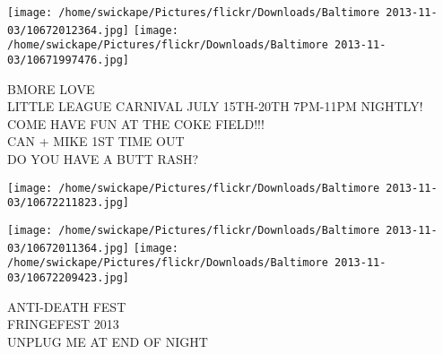 \documentclass[10pt,letterpaper]{article}
\begin{document}
\texttt{[image: /home/swickape/Pictures/flickr/Downloads/Baltimore 2013-11-03/10672012364.jpg]}
\texttt{[image: /home/swickape/Pictures/flickr/Downloads/Baltimore 2013-11-03/10671997476.jpg]}

BMORE LOVE\\
LITTLE LEAGUE CARNIVAL JULY 15TH{-}20TH 7PM{-}11PM NIGHTLY! COME HAVE FUN AT THE COKE FIELD!!!\\
CAN + MIKE 1ST TIME OUT\\
DO YOU HAVE A BUTT RASH?\\
\pagebreak

\texttt{[image: /home/swickape/Pictures/flickr/Downloads/Baltimore 2013-11-03/10672211823.jpg]}

\vspace{0.25in}
\texttt{[image: /home/swickape/Pictures/flickr/Downloads/Baltimore 2013-11-03/10672011364.jpg]}
\texttt{[image: /home/swickape/Pictures/flickr/Downloads/Baltimore 2013-11-03/10672209423.jpg]}

ANTI{-}DEATH FEST\\
FRINGEFEST 2013\\
UNPLUG ME AT END OF NIGHT\\
\pagebreak
\end{document}
